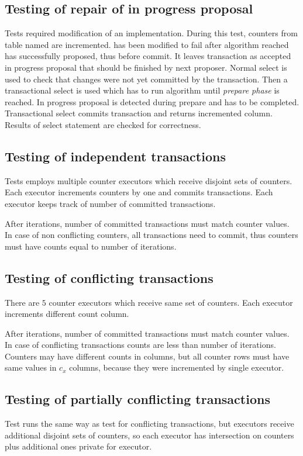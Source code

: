 \subsection{Testing of repair of in progress proposal}
Tests required modification of an implementation. During this test, counters from table named  are incremented. \mpp has been modified to fail after algorithm reached has successfully proposed, thus before commit. It leaves transaction as accepted in progress proposal that should be finished by next proposer. 
Normal select is used to check that changes were not yet committed by the transaction. 
Then a transactional select is used which has to run \mpp algorithm until \emph{prepare phase} is reached. In progress proposal is detected during prepare and has to be completed. Transactional select commits transaction and returns incremented column. Results of select statement are checked for correctness. 

\subsection{Testing of independent transactions}
Tests employs multiple counter executors which receive disjoint sets of counters. Each executor increments counters by one and commits transactions. Each executor keeps track of number of committed transactions.

After iterations, number of committed transactions must match counter values. In case of non conflicting counters, all transactions need to commit, thus counters must have counts equal to number of iterations.

\subsection{Testing of conflicting transactions}
There are $5$ counter executors which receive same set of counters. Each executor increments different count column. 

After iterations, number of committed transactions must match counter values. In case of conflicting transactions counts are less than number of iterations. Counters may have different counts in columns, but all counter rows must have same values in $c_{x}$ columns, because they were incremented by single executor.

\subsection{Testing of partially conflicting transactions}
Test runs the same way as test for conflicting transactions, but executors receive additional disjoint sets of counters, so each executor has intersection on counters plus additional ones private for executor. 

